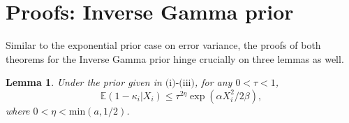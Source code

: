 \documentclass[sn-basic]{sn-jnl}%
\theoremstyle{thmstyleone}%
\newtheorem{lemma}{Lemma}[section]%
\begin{document}
\section{Proofs: Inverse Gamma prior}\label{sec:proofs-inversegamma}

\noindent
Similar to the exponential prior case on error variance, the proofs of both theorems for the Inverse Gamma prior hinge crucially on three lemmas as well.\\

\begin{lemma}\label{lem:ig1}
Under the prior given in $\text{(i)-(iii)}$, for any $0<\tau<1$,
\[
\mathbb{E}(1-\kappa_i|X_i)\leq \tau^{2\eta}\exp(\alpha X_i^2/2\beta),
\]
where $0<\eta<\mbox{min}(a,1/2)$.\\
\end{lemma}
\end{document}
